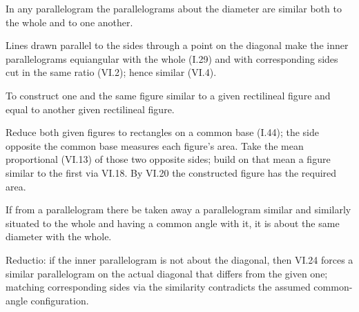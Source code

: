 \begin{claim}
\label{prop:VI.24}
In any parallelogram the parallelograms about the diameter are
similar both to the whole and to one another.
\end{claim}
\begin{evidence}[Proof of VI.24]
\label{ev:VI.24}
Lines drawn parallel to the sides through a point on the diagonal
make the inner parallelograms equiangular with the whole (I.29) and
with corresponding sides cut in the same ratio (VI.2); hence similar
(VI.4).
\end{evidence}

\begin{claim}
\label{prop:VI.25}
To construct one and the same figure similar to a given rectilineal
figure and equal to another given rectilineal figure.
\end{claim}
\begin{evidence}[Proof of VI.25]
\label{ev:VI.25}
Reduce both given figures to rectangles on a common base (I.44);
the side opposite the common base measures each figure's area.  Take
the mean proportional (VI.13) of those two opposite sides; build on
that mean a figure similar to the first via VI.18.  By VI.20 the
constructed figure has the required area.
\end{evidence}

\begin{claim}
\label{prop:VI.26}
If from a parallelogram there be taken away a parallelogram similar
and similarly situated to the whole and having a common angle with
it, it is about the same diameter with the whole.
\end{claim}
\begin{evidence}[Proof of VI.26]
\label{ev:VI.26}
Reductio: if the inner parallelogram is not about the diagonal, then
VI.24 forces a similar parallelogram on the actual diagonal that
differs from the given one; matching corresponding sides via the
similarity contradicts the assumed common-angle configuration.
\end{evidence}

